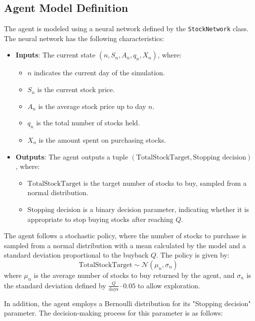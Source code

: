 \documentclass[a4paper, 12pt]{article}
\begin{document}
\subsection{Agent Model Definition}

The agent is modeled using a neural network defined by the \texttt{StockNetwork} class. The neural network has the following characteristics:

\begin{itemize}
    \item \textbf{Inputs}: The current state \( (n, S_n, A_n, q_n, X_n) \), where:
    \begin{itemize}
        \item \( n \) indicates the current day of the simulation.
        \item \( S_n \) is the current stock price.
        \item \( A_n \) is the average stock price up to day \( n \).
        \item \( q_n \) is the total number of stocks held.
        \item \( X_n \) is the amount spent on purchasing stocks.
    \end{itemize}
    \item \textbf{Outputs}: The agent outputs a tuple \( (\text{TotalStockTarget}, \text{Stopping decision}) \), where:
    \begin{itemize}
        \item \( \text{TotalStockTarget} \) is the target number of stocks to buy, sampled from a normal distribution.
        \item \( \text{Stopping decision} \) is a binary decision parameter, indicating whether it is appropriate to stop buying stocks after reaching \( Q \).
    \end{itemize}
\end{itemize}

The agent follows a stochastic policy, where the number of stocks to purchase is sampled from a normal distribution with a mean calculated by the model and a standard deviation proportional to the buyback \( Q \). The policy is given by:
\[
\text{TotalStockTarget} \sim \mathcal{N}(\mu_n, \sigma_n)
\]
where \( \mu_n \) is the average number of stocks to buy returned by the agent, and \( \sigma_n \) is the standard deviation defined by \( \frac{Q}{\text{days}} \cdot 0.05 \) to allow exploration.

In addition, the agent employs a Bernoulli distribution for its "Stopping decision" parameter. The decision-making process for this parameter is as follows:
\end{document}
